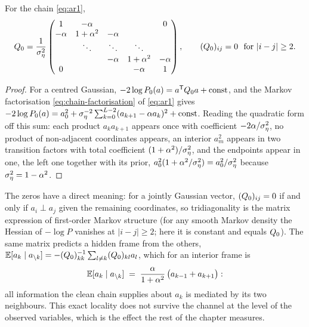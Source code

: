 \begin{proposition}\label{prop:g-Q0}
For the chain \eqref{eq:ar1},
\begin{equation}
  Q_0
  =
  \frac{1}{\sigma_\eta^2}
  \begin{pmatrix}
    1          & -\alpha       &              &              & 0\\
    -\alpha    & 1+\alpha^2    & -\alpha      &              & \\
               & \ddots        & \ddots       & \ddots       & \\
               &               & -\alpha      & 1+\alpha^2   & -\alpha\\
    0          &               &              & -\alpha      & 1
  \end{pmatrix},
  \qquad (Q_0)_{ij} = 0 \ \text{ for } |i-j| \ge 2 .
  \label{eq:g-Q0}
\end{equation}
\end{proposition}

\begin{proof}
For a centred Gaussian, $-2\log P_0(a) = a^{\mathsf{T}} Q_0 a + \mathrm{const}$, and
the Markov factorisation \eqref{eq:chain-factorisation} of \eqref{eq:ar1}
gives $-2\log P_0(a) = a_0^2 + \sigma_\eta^{-2}\sum_{k=0}^{L-2}(a_{k+1} -
\alpha a_k)^2 + \mathrm{const}$. Reading the quadratic form off this sum:
each product $a_k a_{k+1}$ appears once with coefficient $-2\alpha/\sigma_\eta^2$,
no product of non-adjacent coordinates appears, an interior $a_m^2$ appears in
two transition factors with total coefficient $(1+\alpha^2)/\sigma_\eta^2$, and the
endpoints appear in one, the left one together with its prior,
$a_0^2(1 + \alpha^2/\sigma_\eta^2) = a_0^2/\sigma_\eta^2$ because $\sigma_\eta^2 = 1-\alpha^2$.
\end{proof}

The zeros have a direct meaning: for a jointly Gaussian vector,
$(Q_0)_{ij} = 0$ if and only if $a_i \perp a_j$ given the remaining
coordinates, so tridiagonality is the matrix expression of first-order Markov
structure (for any smooth Markov density the Hessian of $-\log P$ vanishes at
$|i-j| \ge 2$; here it is constant and equals $Q_0$). The same matrix predicts
a hidden frame from the others, $\mathbb{E}[a_k \mid a_{\setminus k}] =
-(Q_0)_{kk}^{-1}\sum_{l \ne k}(Q_0)_{kl} a_l$, which for an interior frame is
\begin{equation}
  \mathbb{E}[a_k \mid a_{\setminus k}]
  \;=\; \frac{\alpha}{1+\alpha^2}\,\big(a_{k-1} + a_{k+1}\big):
  \label{eq:g-cond-mean}
\end{equation}
all information the clean chain supplies about $a_k$ is mediated by its two
neighbours. This exact locality does not survive the channel at the level of
the observed variables, which is the effect the rest of the chapter measures.

